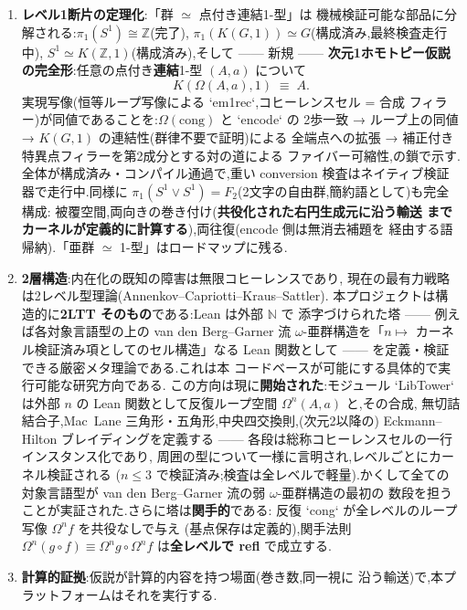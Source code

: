 \documentclass[11pt]{ltjsarticle}
\newcommand{\Z}{\mathbb{Z}}
\newcommand{\N}{\mathbb{N}}
\begin{document}
\begin{enumerate}[leftmargin=1.7em]
\item \textbf{レベル1断片の定理化}:「群 $\simeq$ 点付き連結1-型」は
機械検証可能な部品に分解される:$\pi_1(S^1)\cong\Z$(完了),
$\pi_1(K(G,1))\simeq G$(構成済み,最終検査走行中),
$S^1\simeq K(\Z,1)$(構成済み),そして —— 新規 ——
\textbf{次元1ホモトピー仮説の完全形}:任意の点付き\textbf{連結}1-型
$(A,a)$ について
\[ K(\Omega(A,a),1) \;\equiv\; A. \]
実現写像(恒等ループ写像による `em1rec`,コヒーレンスセル = 合成
フィラー)が同値であることを:$\Omega(\mathrm{cong})$ と `encode` の
2歩一致 → ループ上の同値 → $K(G,1)$ の連結性(群律不要で証明)による
全端点への拡張 → 補正付き特異点フィラーを第2成分とする対の道による
ファイバー可縮性,の鎖で示す.全体が構成済み・コンパイル通過で,重い
conversion 検査はネイティブ検証器で走行中.同様に
$\pi_1(S^1\vee S^1)=F_2$(2文字の自由群,簡約語として)も完全構成:
被覆空間,両向きの巻き付け(\textbf{共役化された右円生成元に沿う輸送
までカーネルが定義的に計算する}),両往復(encode 側は無消去補題を
経由する語帰納).「亜群 $\simeq$ 1-型」はロードマップに残る.
\item \textbf{2層構造}:内在化の既知の障害は無限コヒーレンスであり,
現在の最有力戦略は2レベル型理論(Annenkov--Capriotti--Kraus--Sattler).
本プロジェクトは構造的に\textbf{2LTT そのもの}である:Lean は外部 $\N$ で
添字づけられた塔 —— 例えば各対象言語型の上の van den Berg--Garner 流
$\omega$-亜群構造を「$n\mapsto$ カーネル検証済み項としてのセル構造」なる
Lean 関数として —— を定義・検証できる厳密メタ理論である.これは本
コードベースが可能にする具体的で実行可能な研究方向である.
この方向は現に\textbf{開始された}:モジュール `LibTower` は外部
$n$ の Lean 関数として反復ループ空間 $\Omega^n(A,a)$ と,その合成,
無切詰結合子,Mac~Lane 三角形・五角形,中央四交換則,(次元2以降の)
Eckmann--Hilton ブレイディングを定義する —— 各段は総称コヒーレンスセルの一行インスタンス化であり,
周囲の型について一様に言明され,レベルごとにカーネル検証される
($n \le 3$ で検証済み;検査は全レベルで軽量).かくして全ての
対象言語型が van den Berg--Garner 流の弱 $\omega$-亜群構造の最初の
数段を担うことが実証された.さらに塔は\textbf{関手的}である:
反復 `cong` が全レベルのループ写像 $\Omega^n f$ を共役なしで与え
(基点保存は定義的),関手法則 $\Omega^n(g \circ f) \equiv
\Omega^n g \circ \Omega^n f$ は\textbf{全レベルで refl} で成立する.
\item \textbf{計算的証拠}:仮説が計算的内容を持つ場面(巻き数,同一視に
沿う輸送)で,本プラットフォームはそれを実行する.
\end{enumerate}
\end{document}
